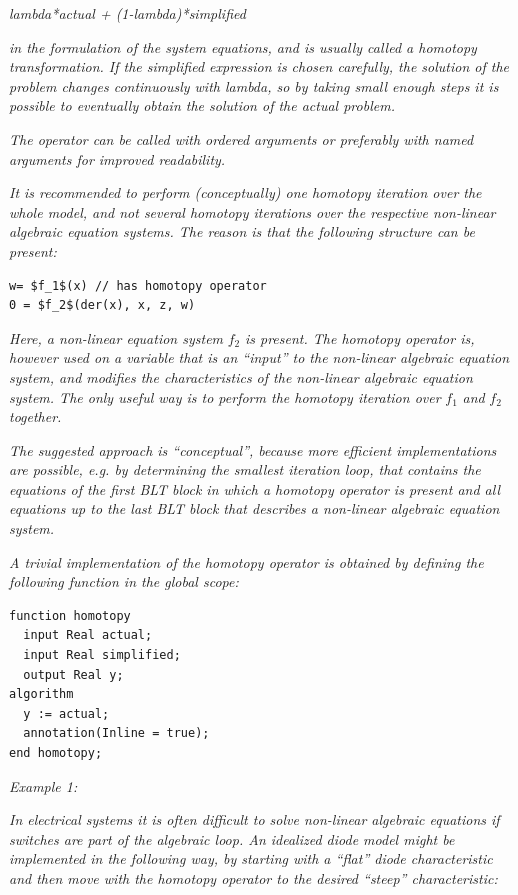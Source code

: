 \documentclass[10pt,a4paper]{report}
\begin{document}
\emph{lambda*actual + (1-lambda)*simplified}

\emph{in the formulation of the system equations, and is usually called
a homotopy transformation. If the simplified expression is chosen
carefully, the solution of the problem changes continuously with lambda,
so by taking small enough steps it is possible to eventually obtain the
solution of the actual problem.}

\emph{The operator can be called with ordered arguments or preferably
with named arguments for improved readability.}

\emph{It is recommended to perform (conceptually) one homotopy iteration
over the whole model, and not several homotopy iterations over the
respective non-linear algebraic equation systems. The reason is that the
following structure can be present:}

\begin{lstlisting}[language=modelica, mathescape=true]
w= $f_1$(x) // has homotopy operator
0 = $f_2$(der(x), x, z, w)
\end{lstlisting}

\emph{Here, a non-linear equation system} $f_2$
\emph{is present. The homotopy operator is, however used on a variable
that is an ``input'' to the non-linear algebraic equation system, and
modifies the characteristics of the non-linear algebraic equation
system. The only useful way is to perform the homotopy iteration over}
$f_1$ \emph{and} $f_2$
\emph{together.}

\emph{The suggested approach is ``conceptual'', because more efficient
implementations are possible, e.g. by determining the smallest iteration
loop, that contains the equations of the first BLT block in which a
homotopy operator is present and all equations up to the last BLT block
that describes a non-linear algebraic equation system.}

\emph{A trivial implementation of the homotopy operator is obtained by
defining the following function in the global scope:}

\begin{lstlisting}[language=modelica]
function homotopy
  input Real actual;
  input Real simplified;
  output Real y;
algorithm
  y := actual;
  annotation(Inline = true);
end homotopy;
\end{lstlisting}

\emph{Example 1:}

\emph{In electrical systems it is often difficult to solve non-linear
algebraic equations if switches are part of the algebraic loop. An
idealized diode model might be implemented in the following way, by
starting with a ``flat'' diode characteristic and then move with the
homotopy operator to the desired ``steep'' characteristic:}
\end{document}
